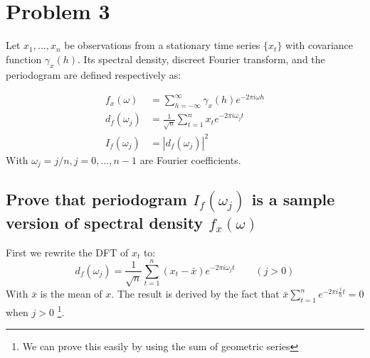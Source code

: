 \section{Problem 3}
Let $x_1, ..., x_n$ be observations from a stationary time series $\{x_t\}$ with covariance function $\gamma_x(h)$. Its spectral density, discreet Fourier transform, and the periodogram are defined respectively as:

\begin{equation}
\begin{split}
f_x(\omega) &= \sum_{h=-\infty}^{\infty} \gamma_x(h) e^{-2\pi i \omega h}\\
d_f(\omega_j) &= \frac{1}{\sqrt{n}}\sum_{t = 1}^{n} x_t e^{-2\pi i \omega_j t}\\
I_f(\omega_j) &= |d_f(\omega_j)|^2
\end{split}
\end{equation}
With $\omega_j = j/n, j = 0, ..., n-1$ are Fourier coefficients.

\subsection{Prove that periodogram $I_f(\omega_j)$ is a sample version of spectral density $f_x(\omega)$}
First we rewrite the DFT of $x_t$ to:
\begin{equation}
d_f(\omega_j) = \frac{1}{\sqrt{n}} \sum_{t=1}^{n} (x_t - \bar{x}) e^{-2\pi i \omega_j t} \qquad (j > 0)
\end{equation}
With $\bar{x}$ is the mean of $x$. The result is derived by the fact that $\bar{x}\sum_{t = 1}^{n} e^{-2\pi i \frac{j}{n} t} = 0$ when $j > 0$ \footnote{We can prove this easily by using the sum of geometric series}.

